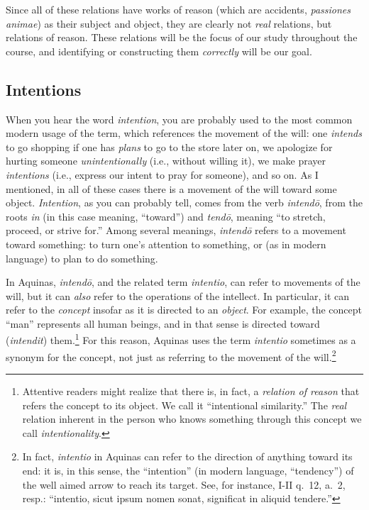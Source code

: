 \documentclass[
  12pt,
]{memoir}
\begin{document}
\noindent Since all of these relations have works of reason (which are
accidents, \emph{passiones animae}) as their subject and object, they
are clearly not \emph{real} relations, but relations of reason. These
relations will be the focus of our study throughout the course, and
identifying or constructing them \emph{correctly} will be our goal.

\subsection{Intentions}\label{intentions}

When you hear the word \emph{intention}, you are probably used to the
most common modern usage of the term, which references the movement of
the will: one \emph{intends} to go shopping if one has \emph{plans} to
go to the store later on, we apologize for hurting someone
\emph{unintentionally} (i.e., without willing it), we make prayer
\emph{intentions} (i.e., express our intent to pray for someone), and so
on. As I mentioned, in all of these cases there is a movement of the
will toward some object. \emph{Intention}, as you can probably tell,
comes from the verb \emph{intendō}, from the roots \emph{in} (in this
case meaning, ``toward'') and \emph{tendō}, meaning ``to stretch,
proceed, or strive for.'' Among several meanings, \emph{intendō} refers
to a movement toward something: to turn one's attention to something, or
(as in modern language) to plan to do something.

In Aquinas, \emph{intendō}, and the related term \emph{intentio}, can
refer to movements of the will, but it can \emph{also} refer to the
operations of the intellect. In particular, it can refer to the
\emph{concept} insofar as it is directed to an \emph{object}. For
example, the concept ``man'' represents all human beings, and in that
sense is directed toward (\emph{intendit}) them.\footnote{Attentive
  readers might realize that there is, in fact, a \emph{relation of
  reason} that refers the concept to its object. We call it
  ``intentional similarity.'' The \emph{real} relation inherent in the
  person who knows something through this concept we call
  \emph{intentionality}.} For this reason, Aquinas uses the term
\emph{intentio} sometimes as a synonym for the concept, not just as
referring to the movement of the will.\footnote{In fact, \emph{intentio}
  in Aquinas can refer to the direction of anything toward its end: it
  is, in this sense, the ``intention'' (in modern language,
  ``tendency'') of the well aimed arrow to reach its target. See, for
  instance, I-II q.~12, a.~2, resp.: ``intentio, sicut ipsum nomen
  sonat, significat in aliquid tendere.''}
\end{document}
